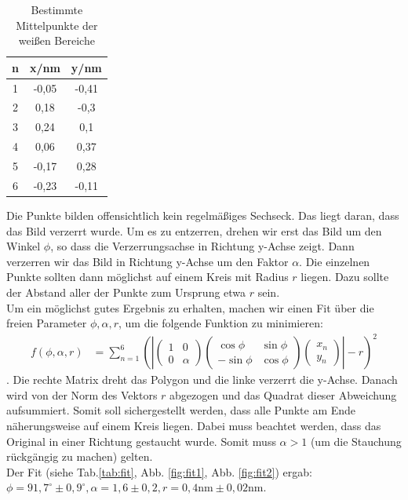 \begin{table}
\centering
\caption{Bestimmte Mittelpunkte der weißen Bereiche}
\begin{tabular}{ccc}
\toprule
n & x/nm & y/nm\\
\midrule
1 & -0,05 &-0,41\\
2 & 0,18&	-0,3\\
3 & 0,24&	0,1\\
4 & 0,06&	0,37\\
5 & -0,17&	0,28\\
6 & -0,23&	-0,11\\
\bottomrule
\end{tabular}
\label{tab:points}
\end{table}
 
Die Punkte bilden offensichtlich kein regelmäßiges Sechseck. Das liegt daran, dass das Bild verzerrt wurde. Um es zu entzerren, drehen wir erst das Bild um den Winkel $\phi$, so dass die Verzerrungsachse in Richtung y-Achse zeigt. Dann verzerren wir das Bild in Richtung y-Achse um den Faktor $\alpha$. Die einzelnen Punkte sollten dann möglichst auf einem Kreis mit Radius $r$ liegen. Dazu sollte der Abstand aller der Punkte zum Ursprung etwa $r$ sein.\\

Um ein möglichst gutes Ergebnis zu erhalten, machen wir einen Fit über die freien Parameter $\phi, \alpha, r$, um die folgende Funktion zu minimieren:
\begin{align*}
f(\phi,\alpha,r) &= \sum\limits_{n = 1}^6 \left(\left|
\begin{pmatrix}
1 & 0\\
0 & \alpha
\end{pmatrix}
\begin{pmatrix}
\cos{\phi} & \sin{\phi}\\
-\sin{\phi} & \cos{\phi}
\end{pmatrix}
\begin{pmatrix}
x_n\\
y_n
\end{pmatrix}
  \right| - r\right)^2
\end{align*}.
Die rechte Matrix dreht das Polygon und die linke verzerrt die y-Achse. Danach wird von der Norm des Vektors $r$ abgezogen und das Quadrat dieser Abweichung aufsummiert. Somit soll sichergestellt werden, dass alle Punkte am Ende näherungsweise auf einem Kreis liegen. Dabei muss beachtet werden, dass das Original in einer Richtung gestaucht wurde. Somit muss $\alpha > 1$ (um die Stauchung rückgängig zu machen) gelten.\\
Der Fit (siehe Tab.\ref{tab:fit}, Abb. \ref{fig:fit1}, Abb. \ref{fig:fit2}) ergab: $\phi = 91,7^\circ \pm 0,9^\circ, \alpha = 1,6 \pm 0,2, r = 0,4\si{\nano\metre} \pm 0,02\si{\nano\metre}$.\\ 

